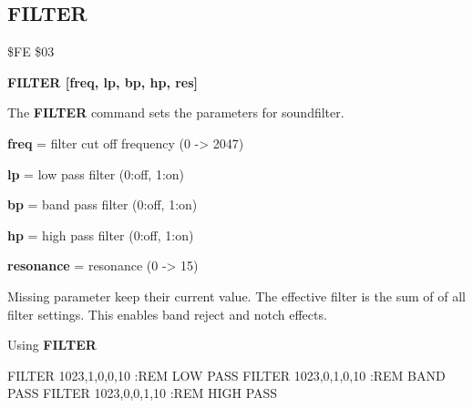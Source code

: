 \newpage
\subsection{FILTER}
\begin{description}[leftmargin=3cm,style=nextline]
\item [Token:] \$FE \$03
\item [Format:] {\bf FILTER [freq, lp, bp, hp, res]}
\item [Usage:] The {\bf FILTER} command sets
               the parameters for soundfilter.

      {\bf freq} = filter cut off frequency (0 -> 2047)

      {\bf lp} = low pass filter (0:off, 1:on)

      {\bf bp} = band pass filter (0:off, 1:on)

      {\bf hp} = high pass filter (0:off, 1:on)

      {\bf resonance} = resonance (0 -> 15)

\item [Remarks:] Missing parameter keep their current value.
                 The effective filter is the sum of
                 of all filter settings.
                 This enables band reject and notch effects.

\item [Example:]
                Using {\bf FILTER}
\begin{screenoutput}
FILTER 1023,1,0,0,10 :REM LOW PASS
FILTER 1023,0,1,0,10 :REM BAND PASS
FILTER 1023,0,0,1,10 :REM HIGH PASS
\end{screenoutput}
\end{description}


\newpage
